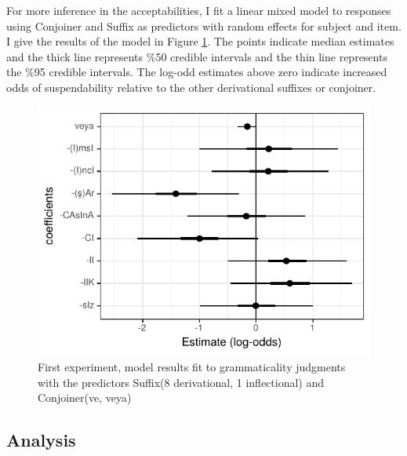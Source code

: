 For more inference in the acceptabilities, I fit a linear mixed model to responses using Conjoiner and Suffix as predictors with random effects for subject and item. I give the results of the model in Figure \ref{fig:derivationalmodel}. The points indicate median estimates and the thick line represents \%50 credible intervals and the thin line represents the \%95 credible intervals. The log-odd estimates above zero indicate increased odds of suspendability relative to the other derivational suffixes or conjoiner.

\begin{knitrout}
\color{fgcolor}\begin{figure}[hbt!]

{\centering \includegraphics[]{experiments/acceptability/report/figure/derivationalmodel-1.pdf} 

}

\caption[First experiment, model results fit to grammaticality judgments with the predictors Suffix(8 derivational, 1 inflectional) and Conjoiner(ve, veya)]{First experiment, model results fit to grammaticality judgments with the predictors Suffix(8 derivational, 1 inflectional) and Conjoiner(ve, veya)}\label{fig:derivationalmodel}
\end{figure}


\end{knitrout}

\subsection{Analysis}

